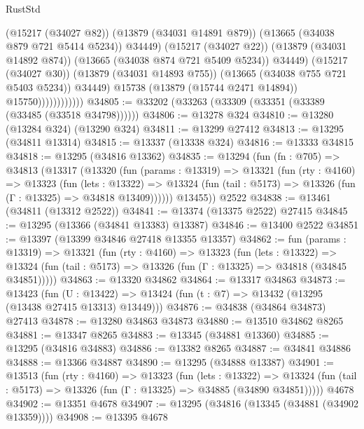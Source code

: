 \begin{lexlean}{RustStd}
\begin{coremodule}
                                  (@15217 (@34027 @82))
                                  (@13879 (@34031 @14891 @879))
                                  (@13665 (@34038 @879 @721 @5414 @5234))
                                  @34449)
                                (@15217 (@34027 @22))
                                (@13879 (@34031 @14892 @874))
                                (@13665 (@34038 @874 @721 @5409 @5234))
                                @34449)
                              (@15217 (@34027 @30))
                              (@13879 (@34031 @14893 @755))
                              (@13665 (@34038 @755 @721 @5403 @5234))
                              @34449)
                            @15738
                            (@13879 (@15744 @2471 @14894))
                            @15750))))))))))))
@34805 := @33202 (@33263 (@33309 (@33351 (@33389 (@33485 (@33518 @34798))))))
@34806 := @13278 @324
@34810 := @13280 (@13284 @324) (@13290 @324)
@34811 := @13299 @27412
@34813 := @13295 (@34811 @13314)
@34815 := @13337 (@13338 @324)
@34816 := @13333 @34815
@34818 := @13295 (@34816 @13362)
@34835 := @13294
    (fun (fn : @705) =>
    @34813
      (@13317
        (@13320
          (fun (params : @13319) =>
          @13321
            (fun (rty : @4160) =>
            @13323
              (fun (lets : @13322) =>
              @13324 (fun (tail : @5173) => @13326 (fun (Γ : @13325) => @34818 @13409))))))
        @13455))
    @2522
@34838 := @13461 (@34811 (@13312 @2522))
@34841 := @13374 (@13375 @2522) @27415
@34845 := @13295 (@13366 (@34841 @13383) @13387)
@34846 := @13400 @2522
@34851 := @13397 (@13399 @34846 @27418 @13355 @13357)
@34862 := fun (params : @13319) =>
  @13321
    (fun (rty : @4160) =>
    @13323
      (fun (lets : @13322) =>
      @13324 (fun (tail : @5173) => @13326 (fun (Γ : @13325) => @34818 (@34845 @34851)))))
@34863 := @13320 @34862
@34864 := @13317 @34863
@34873 := @13423
    (fun (U : @13422) => @13424 (fun (t : @7) => @13432 (@13295 (@13438 @27415 @13313) @13449)))
@34876 := @34838 (@34864 @34873) @27413
@34878 := @13280 @34863 @34873
@34880 := @13510 @34862 @8265
@34881 := @13347 @8265
@34883 := @13345 (@34881 @13360)
@34885 := @13295 (@34816 @34883)
@34886 := @13382 @8265
@34887 := @34841 @34886
@34888 := @13366 @34887
@34890 := @13295 (@34888 @13387)
@34901 := @13513
    (fun (rty : @4160) =>
    @13323
      (fun (lets : @13322) =>
      @13324 (fun (tail : @5173) => @13326 (fun (Γ : @13325) => @34885 (@34890 @34851)))))
    @4678
@34902 := @13351 @4678
@34907 := @13295 (@34816 (@13345 (@34881 (@34902 @13359))))
@34908 := @13395 @4678

\end{coremodule}
\end{lexlean}
